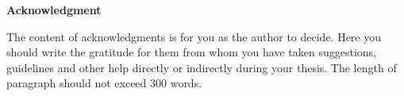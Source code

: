 \documentclass[../main.tex]{subfiles}
\begin{document}
 
\begin{center}
    {\fontsize{16}{1.5em} \selectfont \textbf{Acknowledgment} }
\end{center}

\vspace{\baselineskip}

The content of acknowledgments is for you as the author to decide. Here you should write the gratitude for them from whom you have taken suggestions, guidelines and other help directly or indirectly during your thesis. The length of paragraph should not exceed 300 words. 

\medskip
\end{document}
